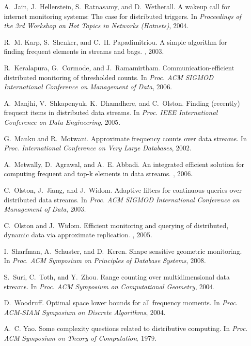 \documentclass[10pt]{article}
\begin{document}
\begin{thebibliography}{10}
A.~Jain, J.~Hellerstein, S.~Ratnasamy, and D.~Wetherall.
\newblock A wakeup call for internet monitoring systems: The case for
  distributed triggers.
\newblock In {\em Proceedings of the 3rd Workshop on Hot Topics in Networks
  ({H}otnets)}, 2004.

R.~M. Karp, S.~Shenker, and C.~H. Papadimitriou.
\newblock A simple algorithm for finding frequent elements in streams and bags.
, 2003.

R.~Keralapura, G.~Cormode, and J.~Ramamirtham.
\newblock Communication-efficient distributed monitoring of thresholded counts.
\newblock In {\em Proc. ACM SIGMOD International Conference on Management of
  Data}, 2006.

A.~Manjhi, V.~Shkapenyuk, K.~Dhamdhere, and C.~Olston.
\newblock Finding (recently) frequent items in distributed data streams.
\newblock In {\em Proc. IEEE International Conference on Data Engineering},
  2005.

G.~Manku and R.~Motwani.
\newblock Approximate frequency counts over data streams.
\newblock In {\em Proc. International Conference on Very Large Databases},
  2002.

A.~Metwally, D.~Agrawal, and A.~E. Abbadi.
\newblock An integrated efficient solution for computing frequent and top-k
  elements in data streams.
, 2006.

C.~Olston, J.~Jiang, and J.~Widom.
\newblock Adaptive filters for continuous queries over distributed data
  streams.
\newblock In {\em Proc. ACM SIGMOD International Conference on Management of
  Data}, 2003.

C.~Olston and J.~Widom.
\newblock Efficient monitoring and querying of distributed, dynamic data via
  approximate replication.
, 2005.

I.~Sharfman, A.~Schuster, and D.~Keren.
\newblock Shape sensitive geometric monitoring.
\newblock In {\em Proc. ACM Symposium on Principles of Database Systems}, 2008.

S.~Suri, C.~Toth, and Y.~Zhou.
\newblock Range counting over multidimensional data streams.
\newblock In {\em Proc. ACM Symposium on Computational Geometry}, 2004.

D.~Woodruff.
\newblock Optimal space lower bounds for all frequency moments.
\newblock In {\em Proc. ACM-SIAM Symposium on Discrete Algorithms}, 2004.

A.~C. Yao.
\newblock Some complexity questions related to distributive computing.
\newblock In {\em Proc. ACM Symposium on Theory of Computation}, 1979.

\end{thebibliography}
\end{document}
